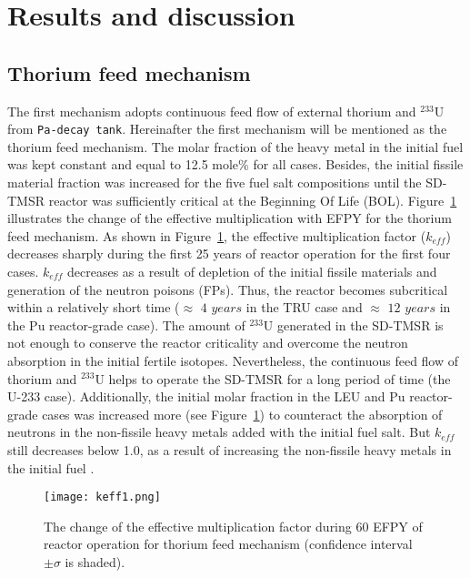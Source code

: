 \section{Results and discussion} \label{Results-and-discussion}

\subsection{Thorium feed mechanism}

The first mechanism adopts continuous feed flow of external thorium and 
$^{233}$U from \texttt{Pa-decay tank}. Hereinafter the first mechanism will be 
mentioned as the thorium feed mechanism. The molar fraction of the heavy metal 
in the initial fuel was kept constant and equal to 12.5 mole\% for all cases. 
Besides, the initial fissile material fraction was increased for the five fuel 
salt compositions until the \gls{SD-TMSR} reactor was sufficiently critical at 
the Beginning Of Life (BOL). 
Figure~\ref{fig:keff1} illustrates the change of the effective multiplication with \gls{EFPY} for the thorium feed mechanism. As shown in Figure~\ref{fig:keff1}, the effective multiplication factor ($k_{eff}$) decreases sharply during the first 25 years of reactor operation for the first four cases. $k_{eff}$ decreases as a result of depletion of the initial fissile materials and generation of the neutron poisons (FPs). Thus, the reactor becomes subcritical within a relatively short time ($\approx$ $4$ $years$ in the \gls{TRU} case and $\approx$ $12$ $years$ in the Pu reactor-grade case). The amount of $^{233}$U generated in the \gls{SD-TMSR} is not enough to conserve the reactor criticality and overcome the neutron absorption in the initial fertile isotopes. Nevertheless, the continuous feed flow of thorium and $^{233}$U helps to operate the \gls{SD-TMSR} for a long period of time (the U-233 case). Additionally, the initial molar fraction in the LEU and Pu reactor-grade cases was increased more (see Figure~\ref{fig:keff1}) to counteract the absorption of neutrons in the non-fissile heavy metals added with the initial fuel salt. But $k_{eff}$ still decreases below 1.0, as a result of increasing the non-fissile heavy metals in the initial fuel \cite{betzler2016modeling}.

\begin{figure}
	\centering
	\texttt{[image: keff1.png]}
	\caption{The change of the effective multiplication factor during 60 \gls{EFPY} of reactor operation for thorium feed mechanism (confidence interval $\pm\sigma$ is shaded).} 
	\label{fig:keff1}
\end{figure}

